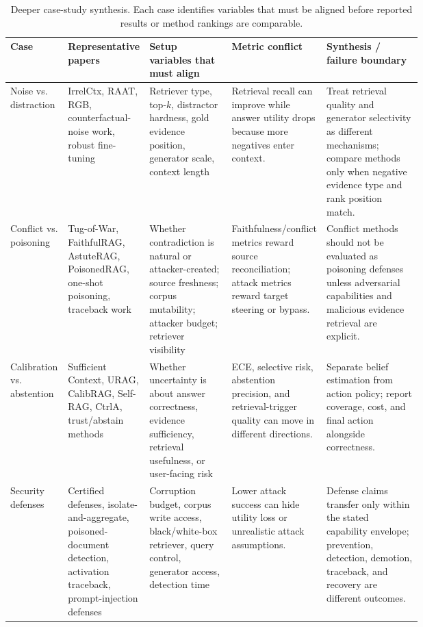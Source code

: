 \begin{table}[t]
\centering
\scriptsize
\renewcommand{\arraystretch}{0.86}
\begin{tabularx}{\linewidth}{>{\raggedright\arraybackslash}p{0.14\linewidth}>{\raggedright\arraybackslash}p{0.18\linewidth}>{\raggedright\arraybackslash}p{0.20\linewidth}>{\raggedright\arraybackslash}p{0.18\linewidth}X}
\toprule
\textbf{Case} & \textbf{Representative papers} & \textbf{Setup variables that must align} & \textbf{Metric conflict} & \textbf{Synthesis / failure boundary} \\
\midrule
Noise vs. distraction & IrrelCtx, RAAT, RGB, counterfactual-noise work, robust fine-tuning & Retriever type, top-$k$, distractor hardness, gold evidence position, generator scale, context length & Retrieval recall can improve while answer utility drops because more negatives enter context. & Treat retrieval quality and generator selectivity as different mechanisms; compare methods only when negative evidence type and rank position match. \\
Conflict vs. poisoning & Tug-of-War, FaithfulRAG, AstuteRAG, PoisonedRAG, one-shot poisoning, traceback work & Whether contradiction is natural or attacker-created; source freshness; corpus mutability; attacker budget; retriever visibility & Faithfulness/conflict metrics reward source reconciliation; attack metrics reward target steering or bypass. & Conflict methods should not be evaluated as poisoning defenses unless adversarial capabilities and malicious evidence retrieval are explicit. \\
Calibration vs. abstention & Sufficient Context, URAG, CalibRAG, Self-RAG, CtrlA, trust/abstain methods & Whether uncertainty is about answer correctness, evidence sufficiency, retrieval usefulness, or user-facing risk & ECE, selective risk, abstention precision, and retrieval-trigger quality can move in different directions. & Separate belief estimation from action policy; report coverage, cost, and final action alongside correctness. \\
Security defenses & Certified defenses, isolate-and-aggregate, poisoned-document detection, activation traceback, prompt-injection defenses & Corruption budget, corpus write access, black/white-box retriever, query control, generator access, detection time & Lower attack success can hide utility loss or unrealistic attack assumptions. & Defense claims transfer only within the stated capability envelope; prevention, detection, demotion, traceback, and recovery are different outcomes. \\
\bottomrule
\end{tabularx}
\caption{Deeper case-study synthesis. Each case identifies variables that must be aligned before reported results or method rankings are comparable.}
\label{tab:deep-case-study-matrix}
\end{table}

